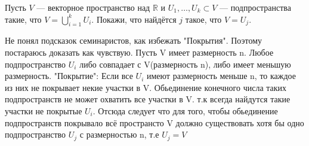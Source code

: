 \documentclass[a4paper,12pt]{article}
\begin{document}
Пусть $V$ — векторное пространство над $\mathbb{R}$ и $U_1,\ldots,U_k \subset V$ — подпространства такие, что $V = \bigcup\limits_{i=1}^k U_i$. Покажи, что найдётся $j$ такое, что $V = U_j$.

\vspace{0.5cm}
Не понял подсказок семинаристов, как избежать "Покрытия". Поэтому постараюсь доказать как чувствую. Пусть V имеет  размерность n. Любое подпространство $U_i$ либо совпадает с V(размерность n), либо имеет меньшую размерность. "Покрытие": Если все $U_i$ имеют размерность меньше n, то каждое из них не покрывает некие участки в V. Обьединение конечного числа таких подпространств не может охватить все участки в V. т.к всегда найдутся такие участки не покрытые $U_i$. Отсюда следует что для того, чтобы обьединение подпространств покрывало всё пространсто V должно существовать хотя бы одно подпространство $U_j$ с размерностью n, т.е $U_j=V$
\end{document}

